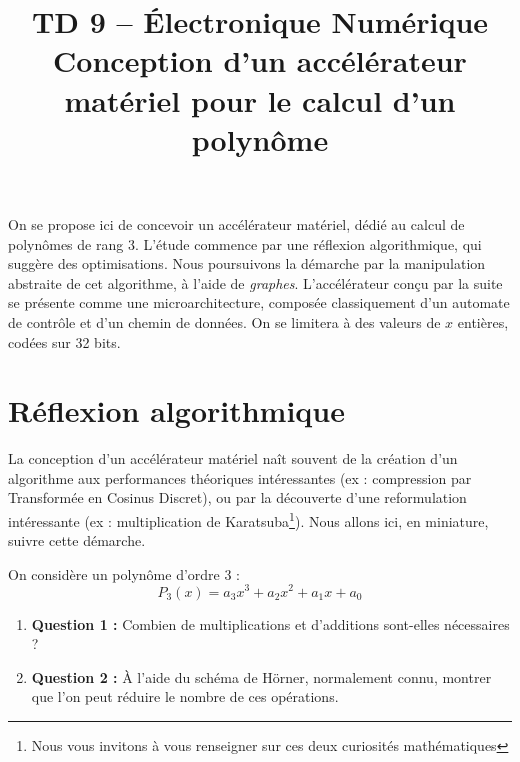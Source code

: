 \documentclass[a4paper,11pt]{article}
\title{\textcolor{primary}{\Huge\bfseries TD 9 -- Électronique Numérique}\\[0.5em] \Large Conception d'un accélérateur matériel pour le calcul d'un polynôme}
\author{}
\date{}
\newif\ifsolutions
\begin{document}
\maketitle
\vspace{-2em}

\begin{notebox}
On se propose ici de concevoir un accélérateur matériel, dédié au calcul de polynômes de rang 3. L'étude commence par une réflexion algorithmique, qui suggère des optimisations. Nous poursuivons la démarche par la manipulation abstraite de cet algorithme, à l'aide de \textit{graphes}. L'accélérateur conçu par la suite se présente comme une microarchitecture, composée classiquement d'un automate de contrôle et d'un chemin de données. On se limitera à des valeurs de $x$ entières, codées sur 32 bits.
\end{notebox}

\vspace{1em}

\section{Réflexion algorithmique}

La conception d'un accélérateur matériel naît souvent de la création d'un algorithme aux performances théoriques intéressantes (ex : compression par Transformée en Cosinus Discret), ou par la découverte d'une reformulation intéressante (ex : multiplication de Karatsuba\footnote{Nous vous invitons à vous renseigner sur ces deux curiosités mathématiques}). Nous allons ici, en miniature, suivre cette démarche.

On considère un polynôme d'ordre 3 :
\begin{equation}
P_3(x)=a_3x^3+a_2x^2+a_1x+a_0
\end{equation}

\begin{questionbox}
\begin{enumerate}
    \item \textbf{Question 1 :} Combien de multiplications et d'additions sont-elles nécessaires ?
    \item \textbf{Question 2 :} À l'aide du schéma de Hörner, normalement connu, montrer que l'on peut réduire le nombre de ces opérations.
\end{enumerate}
\end{questionbox}

\ifsolutions
\begin{solbox}
\textbf{Question 1 :} Il en faut : $3+2+1 = 6$ multiplications, et $3$ additions.

\vspace{0.5em}
\textbf{Question 2 :} On peut réécrire le polynôme précédent de la manière suivante :
\begin{align}
P_3(x) &= x(a_3x^2+a_2x+a_1)+a_0 \\
&=x(x(a_3x+a_2)+a_1)+a_0
\end{align}
On en déduit que sous cette forme, seulement \textbf{3 multiplications} sont nécessaires (en plus des 3 additions).
\end{solbox}
\fi
\end{document}
